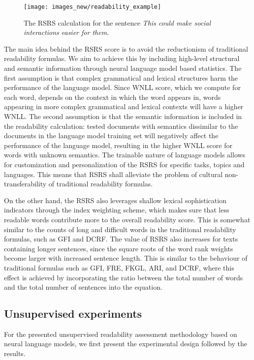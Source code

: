 \documentclass{clv3}
\begin{document}
\begin{figure}[t!]
  \centering
  \texttt{[image: images\_new/readability\_example]}
  \caption{The RSRS calculation for the sentence \textit{This could make social interactions easier for them.}}
  \label{rsrs-example}
\end{figure}

The main idea behind the RSRS score is to avoid the reductionism of traditional readability formulas. We aim to achieve this by including high-level structural and semantic information through neural language model based statistics. The first assumption is that complex grammatical and lexical structures harm the performance of the language model. Since WNLL score, which we compute for each word, depends on the context in which the word appears in, words appearing in more complex grammatical and lexical contexts will have a higher WNLL. The second assumption is that the semantic information is included in the readability calculation: tested documents with semantics dissimilar to the documents in the language model training set will negatively affect the performance of the language model, resulting in the higher WNLL score for words with unknown semantics. The trainable nature of language models allows for customization and personalization of the RSRS for specific tasks, topics and languages. This means that RSRS shall alleviate the problem of cultural non-transferability of traditional readability formulas.   

On the other hand, the RSRS also leverages shallow lexical sophistication indicators through the index weighting scheme, which makes sure that less readable words contribute more to the overall readability score. This is somewhat similar to the counts of long and difficult words in the traditional readability formulas, such as GFI and DCRF. The value of RSRS also increases for texts containing longer sentences, since the square roots of the word rank weights become larger with increased sentence length. This is similar to the behaviour of traditional formulas such as GFI, FRE, FKGL, ARI, and DCRF, where this effect is achieved by incorporating the ratio between the total number of words and the total number of sentences into the equation.  

\subsection{Unsupervised experiments}
\label{sec-unsupervised-experiments}
For the presented unsupervised readability assessment methodology based on neural language models, we first present the experimental design followed by the results.
\end{document}
